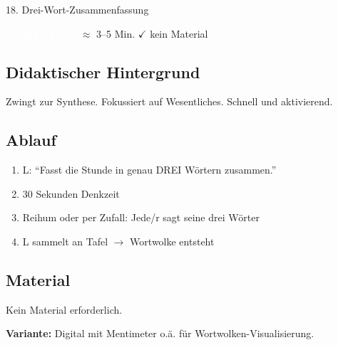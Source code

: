 \documentclass[11pt, a4paper]{article}
\newcommand{\tagSicherung}{\colorbox{sicherung}{\textcolor{white}{\footnotesize\textbf{SICHERUNG}}}}
\newcommand{\zeit}[1]{\textcolor{grau}{\footnotesize $\approx$ #1 Min.}}
\newcommand{\matKeine}{\textcolor{erfolg}{$\checkmark$ kein Material}}
\begin{document}
\vspace{1em}

\begin{methode}{18. Drei-Wort-Zusammenfassung}

\tagSicherung{} \zeit{3--5} \hfill \matKeine

\subsection*{Didaktischer Hintergrund}
Zwingt zur Synthese. Fokussiert auf Wesentliches. Schnell und aktivierend.

\subsection*{Ablauf}
\begin{enumerate}[leftmargin=*]
    \item L: ``Fasst die Stunde in genau DREI Wörtern zusammen.''
    \item 30 Sekunden Denkzeit
    \item Reihum oder per Zufall: Jede/r sagt seine drei Wörter
    \item L sammelt an Tafel $\rightarrow$ Wortwolke entsteht
\end{enumerate}

\subsection*{Material}
\begin{materialbox}
Kein Material erforderlich.

\textbf{Variante:} Digital mit Mentimeter o.ä. für Wortwolken-Visualisierung.
\end{materialbox}

\end{methode}

\vspace{1em}
\end{document}
